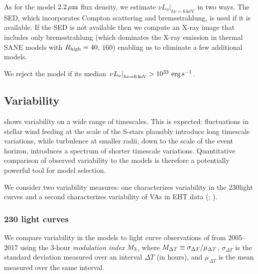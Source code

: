 As for the model $2.2\,\mu\mathrm{m}$ flux density, we estimate $\left.\nu L_\nu\right|_{h\nu=6\,\mathrm{keV}}$ in two ways.
The SED, which incorporates Compton scattering and bremsstrahlung, is used if it is available.
If the SED is not available then we compute an X-ray image that includes only bremsstrahlung (which dominates the X-ray emission in thermal SANE models with $R_\mathrm{high} = 40$, $160$) enabling us to eliminate a few additional models.

We reject the model if its median $\left.\nu L_\nu\right|_{h\nu=6\,\mathrm{keV}} > 10^{33}\,\,\mathrm{erg}\,\mathrm{s}^{-1}$.

\subsection{Variability}

\sgra shows variability on a wide range of timescales.
This is expected: fluctuations in stellar wind feeding at the scale of the S-stars plausibly introduce long timescale variations, while turbulence at smaller radii, down to the scale of the event horizon, introduces a spectrum of shorter timescale variations.
Quantitative comparison of observed variability to the models is therefore a potentially powerful tool for model selection.

We consider two variability measures: one characterizes variability in the 230\GHz light curves \citep{Wielgus2022} and a second  characterizes variability of VAs in EHT data (; \citealt{NoiseModeling}).

\subsubsection{230 \GHz light curves}


We compare variability in the models to light curve observations of \sgra from 2005--2017 using the 3-hour {\em modulation index} $M_{3}$, where $M_{\Delta T} \equiv \sigma_{\Delta T}/\mu_{\Delta T}$, $\sigma_{\Delta T}$ is the standard deviation measured over an interval $\Delta T$ (in hours), and $\mu_{\Delta T}$ is the mean measured over the same interval.

